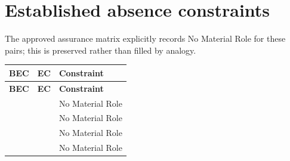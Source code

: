 \section{Established absence constraints}
The approved assurance matrix explicitly records No Material Role for these pairs; this is preserved rather than filled by analogy.
\begingroup\small\setlength{\TableWidth}{\dimexpr\linewidth-6\tabcolsep-4\arrayrulewidth\relax}
\begin{longtable}{|>{\raggedright\arraybackslash}p{0.24\TableWidth}|>{\raggedright\arraybackslash}p{0.33\TableWidth}|>{\raggedright\arraybackslash}p{0.43\TableWidth}|}
\hline\rowcolor{TableHead}\textbf{BEC} & \textbf{EC} & \textbf{Constraint}\\\hline\endfirsthead
\hline\rowcolor{TableHead}\textbf{BEC} & \textbf{EC} & \textbf{Constraint}\\\hline\endhead
\hline\endfoot
\nameref{cap:bec-assurance-criteria-management} & \nameref{cap:ec-01} & No Material Role\\\hline
\nameref{cap:bec-assurance-design} & \nameref{cap:ec-08} & No Material Role\\\hline
\nameref{cap:bec-assurance-criteria-management} & \nameref{cap:ec-09} & No Material Role\\\hline
\nameref{cap:bec-assurance-criteria-management} & \nameref{cap:ec-10} & No Material Role\\\hline
\end{longtable}\endgroup
